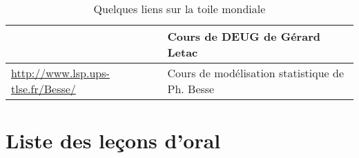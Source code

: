 {{\begin{table}[htbp]
\begin{center}
\begin{sideways}
\begin{tabular}[c]{|l|l|}
 & Cours de DEUG de Gérard Letac\\ \hline
 \url{http://www.lsp.ups-tlse.fr/Besse/}
 & Cours de modélisation statistique de Ph. Besse\\ \hline
\end{tabular}
\end{sideways}
\end{center}
\caption{Quelques liens sur la toile mondiale}\label{ta:w3}
\end{table}


%
\section{Liste des leçons d'oral}
%

}}
